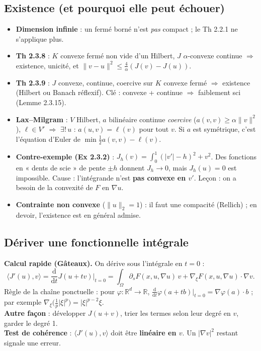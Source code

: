 \documentclass[10pt,a4paper]{article}
\newcommand{\R}{\mathbb{R}}
\newcommand{\sca}[2]{\langle #1,#2\rangle}
\newcommand{\nr}[1]{\|#1\|}
\newcommand{\dd}{\,\mathrm{d}x}
\begin{document}
\subsection{Existence (et pourquoi elle peut échouer)}\label{sec:existence}
\begin{itemize}
\item \textbf{Dimension infinie} : un fermé borné n'est \emph{pas} compact ; le Th 2.2.1 ne s'applique plus.
\item \textbf{Th 2.3.8} : $K$ convexe fermé non vide d'un Hilbert, $J$ $\alpha$-convexe continue $\Rightarrow$ existence, unicité, et $\nr{v-u}^2\le\frac4\alpha(J(v)-J(u))$.
\item \textbf{Th 2.3.9} : $J$ convexe, continue, coercive sur $K$ convexe fermé $\Rightarrow$ existence (Hilbert ou Banach réflexif). Clé : convexe + continue $\Rightarrow$ faiblement sci (Lemme 2.3.15).
\item \textbf{Lax--Milgram} : $V$ Hilbert, $a$ bilinéaire continue \emph{coercive} ($a(v,v)\ge\alpha\nr v^2$), $\ell\in V'$ $\Rightarrow$ $\exists!\,u$ : $a(u,v)=\ell(v)$ pour tout $v$. Si $a$ est symétrique, c'est l'équation d'Euler de $\min\frac12a(v,v)-\ell(v)$.
\item \textbf{Contre-exemple (Ex 2.3.2)} : $J_h(v)=\int_0^1(|v'|-h)^2+v^2$. Des fonctions en « dents de scie » de pente $\pm h$ donnent $J_h\to0$, mais $J_h(u)=0$ est impossible. Cause : l'intégrande n'est \textbf{pas convexe en $v'$}. Leçon : on a besoin de la convexité de $F$ en $\nabla u$.
\item \textbf{Contrainte non convexe} ($\nr u_2=1$) : il faut une compacité (Rellich) ; en devoir, l'existence est en général admise.
\end{itemize}

\subsection{Dériver une fonctionnelle intégrale}\label{sec:deriver}
\begin{methode}[ : dérivée de $J(u)=\int_\Omega F(x,u,\nabla u)\dd$, avec $F=F(x,s,\xi)$]
\textbf{Calcul rapide (Gâteaux).} On dérive sous l'intégrale en $t=0$ :
\[\sca{J'(u)}v=\frac{\mathrm d}{\mathrm dt}J(u+tv)\Big|_{t=0}=\int_\Omega\partial_sF(x,u,\nabla u)\,v+\nabla_\xi F(x,u,\nabla u)\cdot\nabla v .\]
Règle de la chaîne ponctuelle : pour $\varphi:\R^d\to\R$, $\frac{\mathrm d}{\mathrm dt}\varphi(a+tb)|_{t=0}=\nabla\varphi(a)\cdot b$ ; par exemple $\nabla_\xi\big(\frac1p|\xi|^p\big)=|\xi|^{p-2}\xi$.\\
\textbf{Autre façon} : développer $J(u+v)$, trier les termes selon leur degré en $v$, garder le degré 1.\\
\textbf{Test de cohérence} : $\sca{J'(u)}v$ doit être \textbf{linéaire en $v$}. Un $|\nabla v|^2$ restant signale une erreur.
\end{methode}
\end{document}
